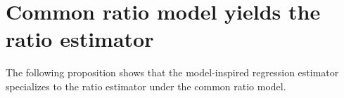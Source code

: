 

\section{Common ratio model yields the ratio estimator}
\setcounter{theorem}{0}
\setcounter{equation}{0}


\renewcommand{\theenumi}{\roman{enumi}}
\renewcommand{\labelenumi}{\textnormal{(\theenumi)}$\;\;$}


The following proposition shows that the model-inspired regression estimator specializes to
the ratio estimator under the common ratio model.
